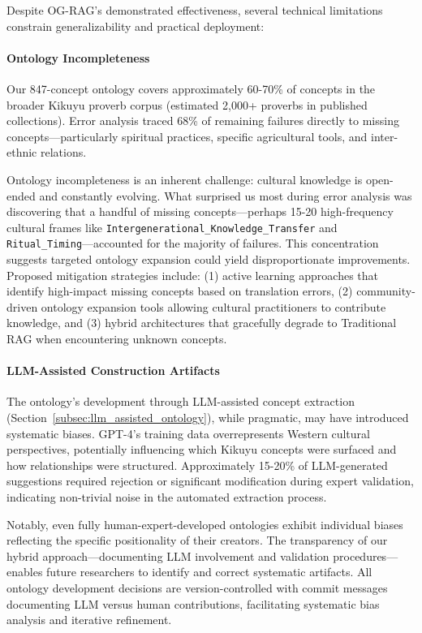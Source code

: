 Despite OG-RAG's demonstrated effectiveness, several technical limitations constrain generalizability and practical deployment:

\paragraph{Ontology Incompleteness}

Our 847-concept ontology covers approximately 60-70\% of concepts in the broader Kikuyu proverb corpus (estimated 2,000+ proverbs in published collections). Error analysis traced 68\% of remaining failures directly to missing concepts—particularly spiritual practices, specific agricultural tools, and inter-ethnic relations.

Ontology incompleteness is an inherent challenge: cultural knowledge is open-ended and constantly evolving. What surprised us most during error analysis was discovering that a handful of missing concepts—perhaps 15-20 high-frequency cultural frames like \texttt{Intergenerational\_Knowledge\_Transfer} and \texttt{Ritual\_Timing}—accounted for the majority of failures. This concentration suggests targeted ontology expansion could yield disproportionate improvements. Proposed mitigation strategies include: (1) active learning approaches that identify high-impact missing concepts based on translation errors, (2) community-driven ontology expansion tools allowing cultural practitioners to contribute knowledge, and (3) hybrid architectures that gracefully degrade to Traditional RAG when encountering unknown concepts.

\paragraph{LLM-Assisted Construction Artifacts}

The ontology's development through LLM-assisted concept extraction (Section~\ref{subsec:llm_assisted_ontology}), while pragmatic, may have introduced systematic biases. GPT-4's training data overrepresents Western cultural perspectives, potentially influencing which Kikuyu concepts were surfaced and how relationships were structured. Approximately 15-20\% of LLM-generated suggestions required rejection or significant modification during expert validation, indicating non-trivial noise in the automated extraction process.

Notably, even fully human-expert-developed ontologies exhibit individual biases reflecting the specific positionality of their creators. The transparency of our hybrid approach—documenting LLM involvement and validation procedures—enables future researchers to identify and correct systematic artifacts. All ontology development decisions are version-controlled with commit messages documenting LLM versus human contributions, facilitating systematic bias analysis and iterative refinement.

